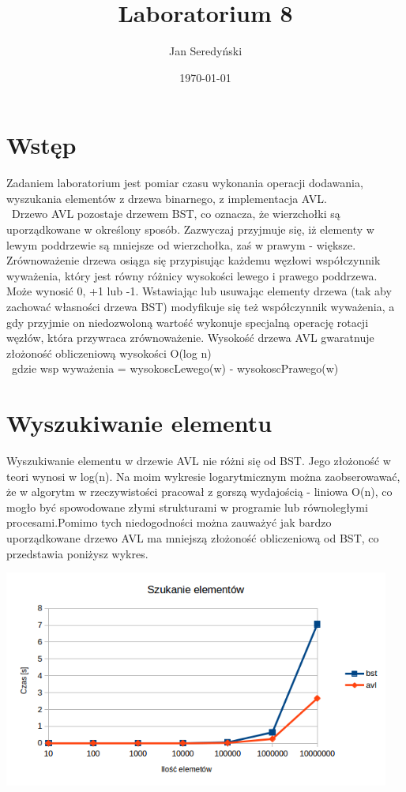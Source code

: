 \documentclass[11pt]{article}
\begin{document}
\title{Laboratorium 8}
\author{Jan Seredyński}
\date{\today}
\maketitle

\section{Wstęp}
Zadaniem laboratorium jest pomiar czasu wykonania operacji dodawania, wyszukania elementów z drzewa binarnego, z implementacja AVL.\\\
Drzewo AVL pozostaje drzewem BST, co oznacza, że wierzchołki są uporządkowane w określony sposób. Zazwyczaj przyjmuje się, iż elementy w lewym poddrzewie są mniejsze od wierzchołka, zaś w prawym - większe. Zrównoważenie drzewa osiąga się przypisując każdemu węzłowi współczynnik wyważenia, który jest równy różnicy wysokości lewego i prawego poddrzewa. Może wynosić 0, +1 lub -1. Wstawiając lub usuwając elementy drzewa (tak aby zachować własności drzewa BST) modyfikuje się też współczynnik wyważenia, a gdy przyjmie on niedozwoloną wartość wykonuje specjalną operację rotacji węzłów, która przywraca zrównoważenie. Wysokość drzewa AVL gwaratnuje złożoność obliczeniową wysokości O(log n)\\\
gdzie wsp wyważenia = wysokoscLewego(w) - wysokoscPrawego(w)


\section{Wyszukiwanie elementu}
Wyszukiwanie elementu w drzewie AVL nie różni się od BST. Jego złożoność w teori wynosi w log(n). Na moim wykresie logarytmicznym można zaobserowawać, że w algorytm w rzeczywistości pracował z gorszą wydajością - liniowa O(n), co mogło być spowodowane
złymi strukturami w programie lub równoległymi procesami.Pomimo tych niedogodności można zauważyć jak bardzo uporządkowane drzewo AVL ma mniejszą złożoność obliczeniową od BST, co przedstawia poniżysz wykres.
\par\vspace{\baselineskip}
\includegraphics[width=5in]{wysz.png}\\\
\newpage
\end{document}
